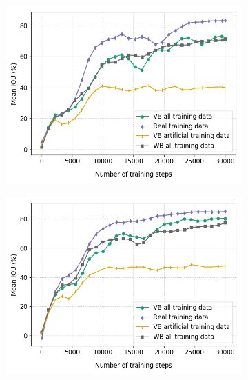 	\begin{figure}
		\begin{subfigure}{.5\textwidth}
			\centering
			\includegraphics[width=1\linewidth]{images/re_val_mob_full}
			\caption{}
		\end{subfigure}
		\begin{subfigure}{.5\textwidth}
			\centering
			\includegraphics[width=1\linewidth]{images/re_val_mob_size}
			\caption{}
		\end{subfigure}
		\begin{subfigure}{.5\textwidth}
			\centering

\end{subfigure}
\end{figure}
